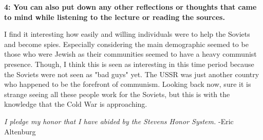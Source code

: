 \documentclass[12pt]{turabian-researchpaper}
\newcommand\question[2]{\textbf{#1: #2}}
\begin{document}
	\question{4}{You can also put down any other reflections or thoughts that came to mind while listening to the lecture or reading the sources.}

		I find it interesting how easily and willing individuals were to help the Soviets and become spies. Especially considering the main demographic seemed to be those who were Jewish as their communities seemed to have a heavy communist presence. Though, I think this is seen as interesting in this time period because the Soviets were not seen as "bad guys" yet. The USSR was just another country who happened to be the forefront of communism. Looking back now, sure it is strange seeing all these people work for the Soviets, but this is with the knowledge that the Cold War is approaching.

		

\vspace*{\fill}
\noindent\textit{I pledge my honor that I have abided by the Stevens Honor System.} -Eric Altenburg
\end{document}
